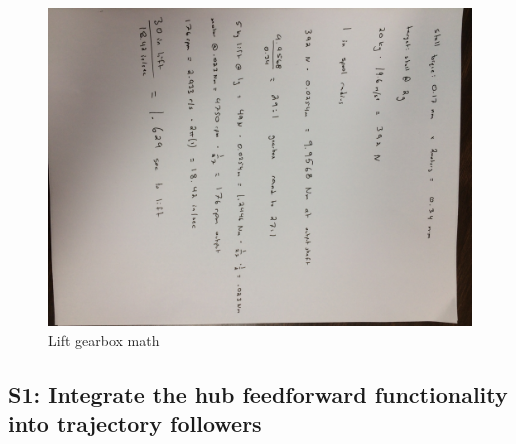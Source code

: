 \documentclass{article}
\begin{document}
\begin{figure}
    \centering
    \includegraphics[width=\textwidth, angle=90]{04_09-24/images/math.jpg}
    \caption{Lift gearbox math}
    \label{fig:my_label}
\end{figure}
\subsection{S1: Integrate the hub feedforward functionality into trajectory followers}
\end{document}
